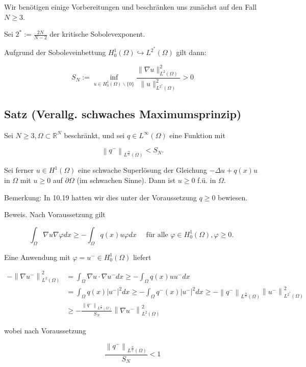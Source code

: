 \documentclass[10pt, letterpaper]{article}
\begin{document}
Wir benötigen einige Vorbereitungen und beschränken uns zunächst auf den Fall $N \geq 3$.

Sei $2^{*}:=\frac{2 N}{N-2}$ der kritische Sobolevexponent.

Aufgrund der Soboleveinbettung $H_{0}^{1}(\Omega) \hookrightarrow L^{2^{*}}(\Omega)$ gilt dann:

$$
S_{N}:=\inf _{u \in H_{0}^{1}(\Omega) \backslash\{0\}} \frac{\|\nabla u\|_{L^{2}(\Omega)}^{2}}{\|u\|_{L^{2^{*}}(\Omega)}^{2}}>0
$$

\subsection*{Satz (Verallg. schwaches Maximumsprinzip)}

Sei $N \geq 3, \Omega \subset \mathbb{R}^{N}$ beschränkt, und sei $q \in L^{\infty}(\Omega)$ eine Funktion mit

$$
\left\|q^{-}\right\|_{L^{\frac{N}{2}}(\Omega)}<S_{N} .
$$

Sei ferner $u \in H^{1}(\Omega)$ eine schwache Superlösung der Gleichung $-\Delta u+q(x) u$ in $\Omega$ mit $u \geq 0$ auf $\partial \Omega$ (im schwachen Sinne). Dann ist $u \geq 0$ f.ü. in $\Omega$.

Bemerkung: In 10.19 hatten wir dies unter der Voraussetzung $q \geq 0$ bewiesen.

Beweis. Nach Voraussetzung gilt

$$
\int_{\Omega} \nabla u \nabla \varphi d x \geq-\int_{\Omega} q(x) u \varphi d x \quad \text { für alle } \varphi \in H_{0}^{1}(\Omega), \varphi \geq 0 \text {. }
$$

Eine Anwendung mit $\varphi=u^{-} \in H_{0}^{1}(\Omega)$ liefert

$$
\begin{aligned}
-\left\|\nabla u^{-}\right\|_{L^{2}(\Omega)}^{2} & =\int_{\Omega} \nabla u \cdot \nabla u^{-} d x \geq-\int_{\Omega} q(x) u u^{-} d x \\
& =\int_{\Omega} q(x)\left|u^{-}\right|^{2} d x \geq-\int_{\Omega} q^{-}(x)\left|u^{-}\right|^{2} d x \geq-\left\|q^{-}\right\|_{L^{\frac{N}{2}}(\Omega)}\left\|u^{-}\right\|_{L^{2^{*}}(\Omega)}^{2} \\
& \geq-\frac{\left\|q^{-}\right\|_{L^{\frac{N}{2}}(\Omega)}}{S_{N}}\left\|\nabla u^{-}\right\|_{L^{2}(\Omega)}^{2}
\end{aligned}
$$

wobei nach Voraussetzung

$$
\frac{\left\|q^{-}\right\|_{L^{\frac{N}{2}}(\Omega)}}{S_{N}}<1
$$
\end{document}
